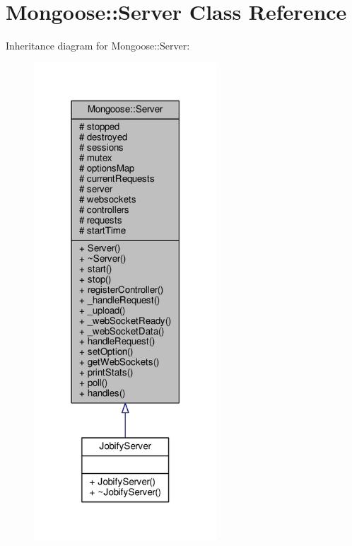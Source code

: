\hypertarget{classMongoose_1_1Server}{}\section{Mongoose\+:\+:Server Class Reference}
\label{classMongoose_1_1Server}


Inheritance diagram for Mongoose\+:\+:Server\+:
\nopagebreak
\begin{figure}[H]
\begin{center}
\leavevmode
\includegraphics[width=194pt]{d5/d41/classMongoose_1_1Server__inherit__graph}
\end{center}
\end{figure}


